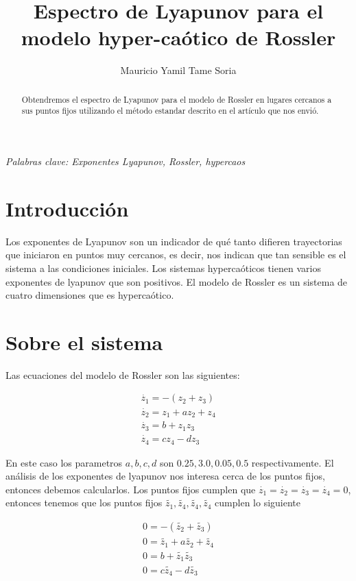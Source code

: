 \documentclass[10pt]{article}
\begin{document}
\title{Espectro de Lyapunov para el modelo hyper-ca\'otico de 
Rossler}
\author{Mauricio Yamil Tame Soria}
\maketitle

\begin{abstract}
Obtendremos el espectro de Lyapunov para el modelo de Rossler en 
lugares cercanos a sus puntos fijos utilizando el m\'etodo estandar 
descrito en el art\'iculo que nos envi\'o.
\end{abstract}

\emph{Palabras clave: Exponentes Lyapunov, Rossler, hypercaos}

\section{Introducci\'on}
Los exponentes de Lyapunov son un indicador de qu\'e tanto 
difieren trayectorias que iniciaron en puntos muy cercanos, es 
decir, nos indican que tan sensible es el sistema a las 
condiciones iniciales.
Los sistemas hyperca\'oticos tienen varios exponentes de lyapunov 
que son positivos.
El modelo de Rossler es un sistema de cuatro dimensiones que es 
hyperca\'otico.
 

\section{Sobre el sistema}
Las ecuaciones del modelo de Rossler son las siguientes:

\begin{eqnarray} 
	\dot{z_1}=-(z_2 + z_3) \\
	\dot{z_2}=z_1 + az_2 + z_4 \\
	\dot{z_3}=b + z_1 z_3 \\
	\dot{z_4}=cz_4 - dz_3
\end{eqnarray}

En este caso los parametros $a,b,c,d$ son $0.25,3.0,0.05,0.5$ 
respectivamente. El an\'alisis de los exponentes de lyapunov nos 
interesa cerca de los puntos fijos, entonces debemos calcularlos. 
Los puntos fijos cumplen que 
$\dot{z_1}=\dot{z_2}=\dot{z_3}=\dot{z_4}=0$, entonces tenemos que 
los puntos fijos $\tilde{z_1}, \tilde{z_4}, \tilde{z_4}, 
\tilde{z_4}$ cumplen lo siguiente

\begin{eqnarray} 
	0=-(\tilde{z_2} + \tilde{z_3}) \\
	0=\tilde{z_1} + a\tilde{z_2} + \tilde{z_4} \\
	0=b + \tilde{z_1} \tilde{z_3} \\
	0=c\tilde{z_4} - d\tilde{z_3}
\end{eqnarray}
\end{document}
